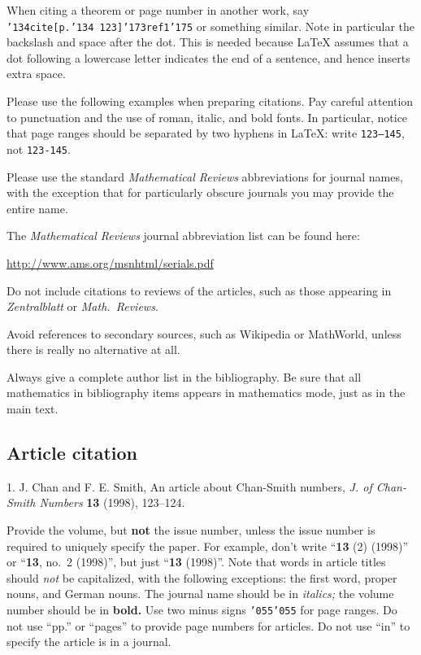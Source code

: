 \documentclass[12pt]{article}
\begin{document}
      When citing a theorem or page number in another work, say
{\tt \char'134cite[p.\char'134\ 123]\char'173ref1\char'175} or something
similar.  Note in particular the backslash and space after the dot.  This is
needed because LaTeX assumes that a dot following a lowercase letter indicates
the end of a sentence, and hence inserts extra space.

     Please use the following examples when preparing citations.
Pay careful attention to punctuation and the use of roman, italic,
and bold fonts.   In particular, notice that page ranges should be separated
by two hyphens in LaTeX:  write {\tt 123--145}, not {\tt 123-145}.

Please use the standard {\it Mathematical Reviews}
abbreviations for journal names, with the exception that for particularly
obscure journals you may provide the entire name.

     The {\it Mathematical Reviews} journal abbreviation list can be
found here:

\centerline{\url{http://www.ams.org/msnhtml/serials.pdf}}

     Do not include citations to reviews of the articles, such as those
appearing in {\it Zentralblatt} or {\it Math.\ Reviews}.

     Avoid references to secondary sources, such as Wikipedia or MathWorld,
unless there is really no alternative at all.

Always give a complete author list in the bibliography.  Be sure that
all mathematics in bibliography items appears in mathematics mode, just as
in the main text.

\subsection{Article citation}

    1.  J. Chan and F. E. Smith, An article about Chan-Smith numbers,
    {\it J. of Chan-Smith Numbers} {\bf 13} (1998), 123--124.

\smallskip

Provide the volume, but {\bf not} the issue number, unless the issue
number is required to uniquely specify the paper.  For example,
don't write ``{\bf 13} (2) (1998)'' or ``{\bf 13}, no.~2 (1998)'', but
just ``{\bf 13} (1998)''.
Note that words in article
titles should {\it not\/} be capitalized, with the following exceptions:
the first word, proper nouns, and German nouns.    The journal name should
be in {\it italics;} the volume number should be in {\bf bold.}
Use two minus signs {\tt \char'055\char'055} for page ranges.
Do not use ``pp.'' or ``pages'' to
provide page numbers for articles.   
Do not use ``in'' to specify the article is in a journal.
\end{document}
